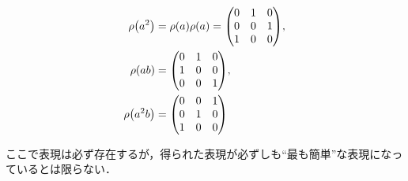 \documentclass[main]{subfiles}
\begin{document}
\begin{ex}
\begin{align*}
				\rho\qty(a^2)  & =\rho\qty(a)\rho\qty(a)=\mqty(0 & 1 & 0 \\0&0&1\\1&0&0),\\
				\rho\qty(ab)   & =\mqty(0                        & 1 & 0 \\1&0&0\\0&0&1),\\
				\rho\qty(a^2b) & =\mqty(0                        & 0 & 1 \\0&1&0\\1&0&0)
			\end{align*}
			\begin{note*}
				ここで表現は必ず存在するが，得られた表現が必ずしも``最も簡単''な表現になっているとは限らない．
			\end{note*}
		\end{ex}
\end{document}
